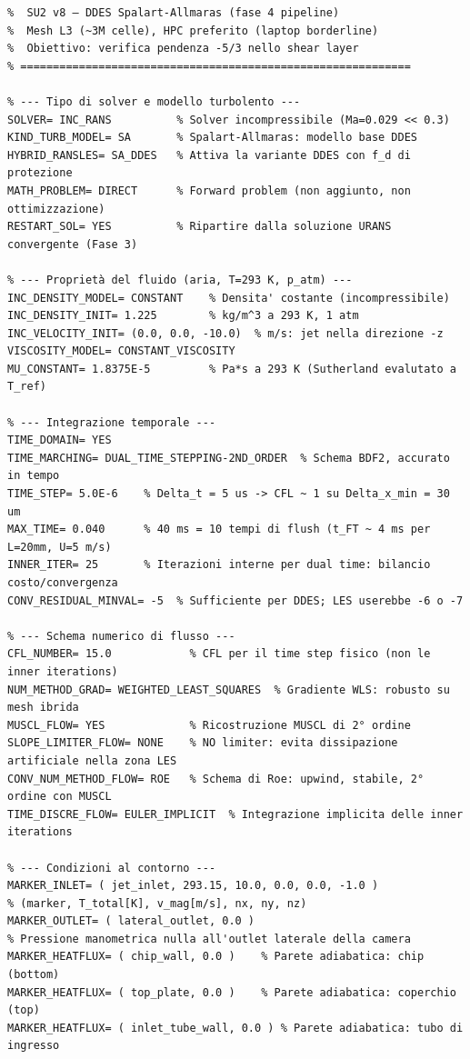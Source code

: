 \documentclass[11pt,a4paper]{article}
\begin{document}
\begin{lstlisting}[style=SU2cfg, caption={File di configurazione SU2 v8 per DDES SA — Fase 4 della pipeline. Commenti riga per riga.}, label=lst:ddes_cfg]
% ============================================================
%  SU2 v8 — DDES Spalart-Allmaras (fase 4 pipeline)
%  Mesh L3 (~3M celle), HPC preferito (laptop borderline)
%  Obiettivo: verifica pendenza -5/3 nello shear layer
% ============================================================

% --- Tipo di solver e modello turbolento ---
SOLVER= INC_RANS          % Solver incompressibile (Ma=0.029 << 0.3)
KIND_TURB_MODEL= SA       % Spalart-Allmaras: modello base DDES
HYBRID_RANSLES= SA_DDES   % Attiva la variante DDES con f_d di protezione
MATH_PROBLEM= DIRECT      % Forward problem (non aggiunto, non ottimizzazione)
RESTART_SOL= YES          % Ripartire dalla soluzione URANS convergente (Fase 3)

% --- Proprietà del fluido (aria, T=293 K, p_atm) ---
INC_DENSITY_MODEL= CONSTANT    % Densita' costante (incompressibile)
INC_DENSITY_INIT= 1.225        % kg/m^3 a 293 K, 1 atm
INC_VELOCITY_INIT= (0.0, 0.0, -10.0)  % m/s: jet nella direzione -z
VISCOSITY_MODEL= CONSTANT_VISCOSITY
MU_CONSTANT= 1.8375E-5         % Pa*s a 293 K (Sutherland evalutato a T_ref)

% --- Integrazione temporale ---
TIME_DOMAIN= YES
TIME_MARCHING= DUAL_TIME_STEPPING-2ND_ORDER  % Schema BDF2, accurato in tempo
TIME_STEP= 5.0E-6    % Delta_t = 5 us -> CFL ~ 1 su Delta_x_min = 30 um
MAX_TIME= 0.040      % 40 ms = 10 tempi di flush (t_FT ~ 4 ms per L=20mm, U=5 m/s)
INNER_ITER= 25       % Iterazioni interne per dual time: bilancio costo/convergenza
CONV_RESIDUAL_MINVAL= -5  % Sufficiente per DDES; LES userebbe -6 o -7

% --- Schema numerico di flusso ---
CFL_NUMBER= 15.0            % CFL per il time step fisico (non le inner iterations)
NUM_METHOD_GRAD= WEIGHTED_LEAST_SQUARES  % Gradiente WLS: robusto su mesh ibrida
MUSCL_FLOW= YES             % Ricostruzione MUSCL di 2° ordine
SLOPE_LIMITER_FLOW= NONE    % NO limiter: evita dissipazione artificiale nella zona LES
CONV_NUM_METHOD_FLOW= ROE   % Schema di Roe: upwind, stabile, 2° ordine con MUSCL
TIME_DISCRE_FLOW= EULER_IMPLICIT  % Integrazione implicita delle inner iterations

% --- Condizioni al contorno ---
MARKER_INLET= ( jet_inlet, 293.15, 10.0, 0.0, 0.0, -1.0 )
% (marker, T_total[K], v_mag[m/s], nx, ny, nz)
MARKER_OUTLET= ( lateral_outlet, 0.0 )
% Pressione manometrica nulla all'outlet laterale della camera
MARKER_HEATFLUX= ( chip_wall, 0.0 )    % Parete adiabatica: chip (bottom)
MARKER_HEATFLUX= ( top_plate, 0.0 )    % Parete adiabatica: coperchio (top)
MARKER_HEATFLUX= ( inlet_tube_wall, 0.0 ) % Parete adiabatica: tubo di ingresso


\end{lstlisting}
\end{document}
